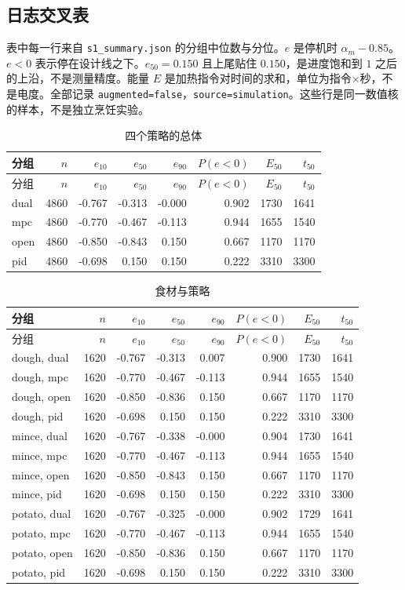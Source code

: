 \subsection{日志交叉表}
表中每一行来自 \texttt{s1\_summary.json} 的分组中位数与分位。$e$ 是停机时 $\alpha_m-0.85$。$e{<}0$ 表示停在设计线之下。$e_{50}=0.150$ 且上尾贴住 $0.150$，是进度饱和到 $1$ 之后的上沿，不是测量精度。能量 $E$ 是加热指令对时间的求和，单位为指令$\times$秒，不是电度。全部记录 \texttt{augmented=false}，\texttt{source=simulation}。这些行是同一数值核的样本，不是独立烹饪实验。
\begin{longtable}{lrrrrrrr}
\caption{四个策略的总体}\\
\toprule
分组 & $n$ & $e_{10}$ & $e_{50}$ & $e_{90}$ & $P(e{<}0)$ & $E_{50}$ & $t_{50}$ \\
\midrule
\endfirsthead
\toprule
分组 & $n$ & $e_{10}$ & $e_{50}$ & $e_{90}$ & $P(e{<}0)$ & $E_{50}$ & $t_{50}$ \\
\midrule
\endhead
dual & 4860 & -0.767 & -0.313 & -0.000 & 0.902 & 1730 & 1641 \\
mpc & 4860 & -0.770 & -0.467 & -0.113 & 0.944 & 1655 & 1540 \\
open & 4860 & -0.850 & -0.843 & 0.150 & 0.667 & 1170 & 1170 \\
pid & 4860 & -0.698 & 0.150 & 0.150 & 0.222 & 3310 & 3300 \\
\bottomrule
\end{longtable}

\begin{longtable}{lrrrrrrr}
\caption{食材与策略}\\
\toprule
分组 & $n$ & $e_{10}$ & $e_{50}$ & $e_{90}$ & $P(e{<}0)$ & $E_{50}$ & $t_{50}$ \\
\midrule
\endfirsthead
\toprule
分组 & $n$ & $e_{10}$ & $e_{50}$ & $e_{90}$ & $P(e{<}0)$ & $E_{50}$ & $t_{50}$ \\
\midrule
\endhead
dough, dual & 1620 & -0.767 & -0.313 & 0.007 & 0.900 & 1730 & 1641 \\
dough, mpc & 1620 & -0.770 & -0.467 & -0.113 & 0.944 & 1655 & 1540 \\
dough, open & 1620 & -0.850 & -0.836 & 0.150 & 0.667 & 1170 & 1170 \\
dough, pid & 1620 & -0.698 & 0.150 & 0.150 & 0.222 & 3310 & 3300 \\
mince, dual & 1620 & -0.767 & -0.338 & -0.000 & 0.904 & 1730 & 1641 \\
mince, mpc & 1620 & -0.770 & -0.467 & -0.113 & 0.944 & 1655 & 1540 \\
mince, open & 1620 & -0.850 & -0.843 & 0.150 & 0.667 & 1170 & 1170 \\
mince, pid & 1620 & -0.698 & 0.150 & 0.150 & 0.222 & 3310 & 3300 \\
potato, dual & 1620 & -0.767 & -0.325 & -0.000 & 0.902 & 1729 & 1641 \\
potato, mpc & 1620 & -0.770 & -0.467 & -0.113 & 0.944 & 1655 & 1540 \\
potato, open & 1620 & -0.850 & -0.836 & 0.150 & 0.667 & 1170 & 1170 \\
potato, pid & 1620 & -0.698 & 0.150 & 0.150 & 0.222 & 3310 & 3300 \\
\bottomrule
\end{longtable}

